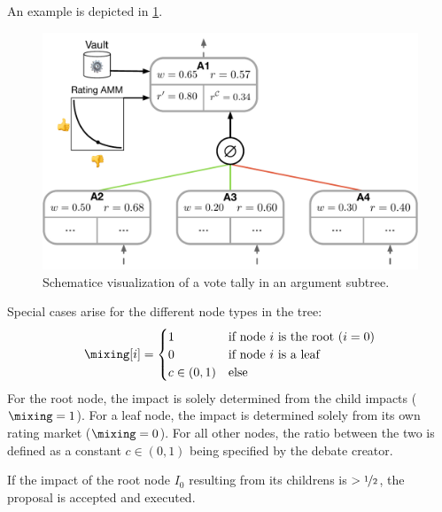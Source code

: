 \documentclass[%
aip,
amsmath,amssymb,
reprint,%
unsortedaddress,
nofootinbib
]{revtex4-2}
\begin{document}
An example is depicted in \cref{fig:VoteTallying}.
\begin{figure}
	\includegraphics[width=0.99\linewidth]{Graphics/VoteTallying.pdf}
	\caption{Schematice visualization of a vote tally in an argument subtree.}
	\label{fig:VoteTallying}
\end{figure}


Special cases arise for the different node types in the tree:
\begin{equation}
	\mixing[i] =
	\begin{cases}
		1 & \text{if node $i$ is the root ($i=0$)}\\
		0 & \text{if node $i$ is a leaf}\\
		c \in(0,1) & \text{else}
	\end{cases}
\end{equation}
For the root node, the impact is solely determined from the child impacts  ($\mixing=1$).
For a leaf node, the impact is determined solely from its own rating market ($\mixing=0$).
For all other nodes,
the ratio between the two is defined as a constant $c\in(0,1)$ being specified by the debate creator.


If the impact of the root node $I_0$ resulting from its childrens is $>\nicefrac{1}{2}$, 
the proposal is accepted and executed.



\end{document}
